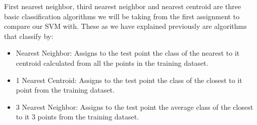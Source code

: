 First nearest neighbor, third nearest neighbor and nearest centroid are three basic
classification algorithms we will be taking from the first assignment to compare our
SVM with. These as we have explained previously are algorithms that classify by:
\begin{itemize}
    \item Nearest Neighbor: Assigns to the test point the class of the nearest to it 
    centroid calculated from all the points in the training dataset. 
    \item 1 Nearest Centroid: Assigns to the test point the class of the closest to it 
    point from the training dataset.
    \item 3 Nearest Neighbor: Assigns to the test point the average class of the closest
    to it 3 points from the training dataset.
\end{itemize}